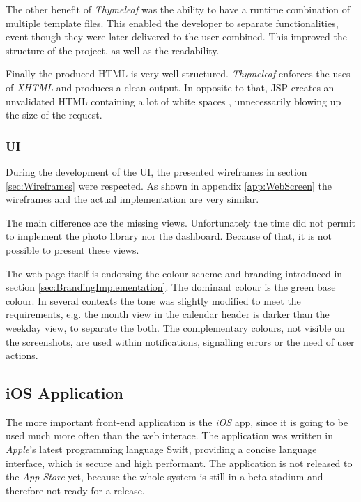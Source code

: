 The other benefit of \emph{Thymeleaf} was the ability to have a runtime combination of multiple template files. This enabled the developer to separate functionalities, event though they were later delivered to the user combined. This improved the structure of the project, as well as the readability.

Finally the produced \gls{HTML} is very well structured. \emph{Thymeleaf} enforces the uses of \emph{XHTML} and produces a clean output. In opposite to that, \gls{JSP} creates an unvalidated \gls{HTML} containing a lot of white spaces , unnecessarily blowing up the size of the request.

\subsubsection{UI}

During the development of the \gls{UI}, the presented wireframes in section \vref{sec:Wireframes} were respected. As shown in appendix \vref{app:WebScreen} the wireframes and the actual implementation are very similar. 

The main difference are the missing views. Unfortunately the time did not permit to implement the photo library nor the dashboard. Because of that, it is not possible to present these views.

The web page itself is endorsing the colour scheme and branding introduced in section \vref{sec:BrandingImplementation}. The dominant colour is the green base colour. In several contexts the tone was slightly modified to meet the requirements, e.g. the month view in the calendar header is darker than the weekday view, to separate the both. The complementary colours, not visible on the screenshots, are used within notifications, signalling errors or the need of user actions.

\subsection{iOS Application}

The more important front-end application is the \emph{iOS} app, since it is going to be used much more often than the web interace. The application was written in \emph{Apple}'s latest programming language \gls{Swift}, providing a concise language interface, which is secure and high performant. The application is not released to the \emph{App Store} yet, because the whole system is still in a beta stadium and therefore not ready for a release.


